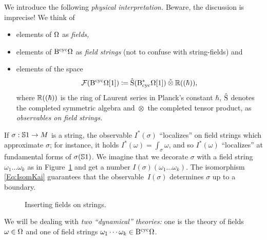 \documentclass[\MainFolder/Text.tex]{subfiles}
\begin{document}
We introduce the following \emph{physical interpretation.} Beware, the discussion is imprecise!
We think of
\begin{itemize}
\item elements of $\Omega$ as \emph{fields,}
\item elements of $\mathrm{B}^{\mathrm{cyc}} \Omega$ as \emph{field strings} (not to confuse with string-fields) and
\item elements of the space
$$ \Fun(\BCyc \DR[1]) \coloneqq \hat{\Sym}(\DBCyc\DR[1])\COtimes \R((\hbar)), $$
where $\mathbb{R}((\hbar))$ is the ring of Laurent series in Planck's constant $\hbar$, $\hat{\mathrm{S}}$ denotes the completed symmetric algebra and $\hat{\otimes}$ the completed tensor product, as \emph{observables on field strings.}
\end{itemize}
If $\sigma:\mathbb{S}{1}\rightarrow M$ is a string, the observable $I^*(\sigma)$ ``localizes'' on field strings which approximate $\sigma$; for instance, it holds $I^*(\omega) = \int_{\sigma} \omega$, and so $I^*(\omega)$ ``localizes'' at fundamental forms of $\sigma(\mathbb{S}{1})$. We imagine that we decorate $\sigma$ with a field string $\omega_1 \dotsc \omega_k$ as in Figure~\ref{Fig:GeomStr} and get a number $I(\sigma)(\omega_1\dotsc\omega_k)$. The isomorphism \eqref{Eq:IsomKai} guarantees that the observable~$I(\sigma)$ determines $\sigma$ up to a boundary.
\begin{figure}[t]
 \centering
 \def\rad{2}
 \def\len{.4}
 \def\smalllen{.1}
 \def\num{6} 
 \caption{Inserting fields on strings.}
 \label{Fig:GeomStr}
\end{figure}
We will be dealing with \emph{two ``dynamical'' theories:} one is the theory of fields $\omega\in \Omega$ and one of field strings $\omega_1 \dotsb \omega_k \in \mathrm{B}^{\mathrm{cyc}} \Omega$.
\end{document}
